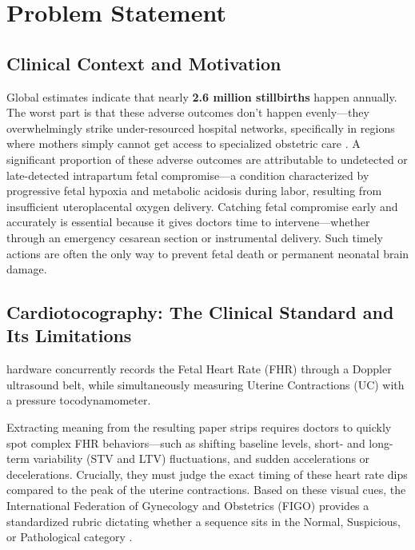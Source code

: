 \documentclass[conference]{IEEEtran}
\begin{document}
\begin{abstract}
\textbf{Index Terms}---Cardiotocography, Fetal Heart Rate, Fetal Compromise,
Deep Learning, Stacking Ensemble, Tri-Modal Fusion, TimeGAN, Uncertainty
Quantification, Explainable AI, Edge Deployment, Clinical Decision Support.
\end{abstract}


\section{Problem Statement}

\subsection{Clinical Context and Motivation}

Global estimates indicate that nearly \textbf{2.6 million stillbirths} happen annually. The worst part is that these adverse outcomes don't happen evenly—they overwhelmingly strike under-resourced hospital networks, specifically in regions where mothers simply cannot get access to specialized obstetric care \cite{who2020stillbirth}. A
significant proportion of these adverse outcomes are attributable to
undetected or late-detected intrapartum fetal compromise—a condition
characterized by progressive fetal hypoxia and metabolic acidosis during labor,
resulting from insufficient uteroplacental oxygen delivery. Catching fetal
compromise early and accurately is essential because it gives doctors time
to intervene—whether through an emergency cesarean section or instrumental
delivery. Such timely actions are often the only way to prevent fetal death
or permanent neonatal brain damage.

\subsection{Cardiotocography: The Clinical Standard and Its Limitations}

hardware concurrently records the Fetal Heart Rate (FHR) through a Doppler 
ultrasound belt, while simultaneously measuring Uterine Contractions (UC) 
with a pressure tocodynamometer. 

Extracting meaning from the resulting paper strips requires doctors to quickly spot complex FHR behaviors---such as shifting baseline levels, short- and long-term variability (STV and LTV) fluctuations, and sudden accelerations or decelerations. Crucially, they must judge the exact timing of these heart rate dips compared to the peak of the uterine contractions. Based on these visual cues, the International Federation of Gynecology and Obstetrics (FIGO) provides a standardized rubric dictating whether a sequence sits in the Normal, Suspicious, or Pathological category \cite{figo2015}.
\end{document}
